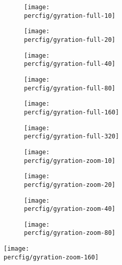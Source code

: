 \documentclass[12pt,a4paper]{article}
\newcommand{\percfig}{../fig/percolation}
\begin{document}
	\begin{figure}
		\centering
		\begin{subfigure}{0.45\linewidth}
			\centering
			\texttt{[image: \\percfig/gyration-full-10]}
		\end{subfigure}
		\begin{subfigure}{0.45\linewidth}
			\centering
			\texttt{[image: \\percfig/gyration-full-20]}
		\end{subfigure}
		\begin{subfigure}{0.45\linewidth}
			\centering
			\texttt{[image: \\percfig/gyration-full-40]}
		\end{subfigure}
		\begin{subfigure}{0.45\linewidth}
			\centering
			\texttt{[image: \\percfig/gyration-full-80]}
		\end{subfigure}
		\begin{subfigure}{0.45\linewidth}
			\centering
			\texttt{[image: \\percfig/gyration-full-160]}
		\end{subfigure}
		\begin{subfigure}{0.45\linewidth}
			\centering
			\texttt{[image: \\percfig/gyration-full-320]}
		\end{subfigure}
	\end{figure}
	\thispagestyle{empty}
	\begin{figure}
		\centering
		\begin{subfigure}{0.45\linewidth}
			\centering
			\texttt{[image: \\percfig/gyration-zoom-10]}
		\end{subfigure}
		\begin{subfigure}{0.45\linewidth}
			\centering
			\texttt{[image: \\percfig/gyration-zoom-20]}
		\end{subfigure}
		\begin{subfigure}{0.45\linewidth}
			\centering
			\texttt{[image: \\percfig/gyration-zoom-40]}
		\end{subfigure}
		\begin{subfigure}{0.45\linewidth}
			\centering
			\texttt{[image: \\percfig/gyration-zoom-80]}
		\end{subfigure}
	\end{figure}
	\begin{figure}
		\centering
		\texttt{[image: \\percfig/gyration-zoom-160]}
	\end{figure}
\end{document}
